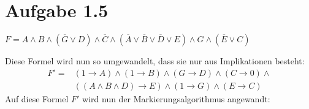 \documentclass[a4paper,12pt]{article}
\begin{document}
	\section*{Aufgabe 1.5}
	\begin{center}
		$F = A \wedge B \wedge \left( \overline{G} \vee D\right) \wedge \overline{C} \wedge \left( \overline{A} \vee \overline{B} \vee \overline{D} \vee E\right) \wedge G \wedge \left( \overline{E} \vee C\right)$\\
	\end{center}
	Diese Formel wird nun so umgewandelt, dass sie nur aus Implikationen besteht:
	\begin{align*}
		F' = &\left( 1 \rightarrow A\right) \wedge \left( 1 \rightarrow B\right) \wedge \left( G \rightarrow D\right) \wedge \left( C \rightarrow 0\right) \wedge \\&\left( \left(A \wedge B \wedge D\right) \rightarrow E\right) \wedge \left( 1 \rightarrow G\right) \wedge \left( E \rightarrow C\right)
	\end{align*}
	Auf diese Formel $F'$ wird nun der Markierungsalgorithmus angewandt:
	
\end{document}
